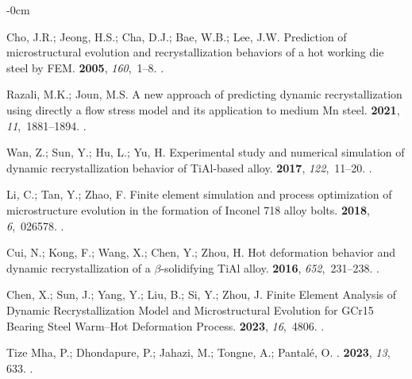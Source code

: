 \documentclass[metals,article,accept,pdftex,moreauthors]{Definitions/mdpi}
\begin{document}
\begin{adjustwidth}{-\extralength}{0cm}
\begin{thebibliography}{999}
Cho, J.R.; Jeong, H.S.; Cha, D.J.; Bae, W.B.; Lee, J.W.
\newblock Prediction of microstructural evolution and recrystallization
  behaviors of a hot working die steel by FEM.
 {\bf 2005}, {\em
  160},~1--8.
.

Razali, M.K.; Joun, M.S.
\newblock A new approach of predicting dynamic recrystallization using directly
  a flow stress model and its application to medium Mn steel.
 {\bf 2021}, {\em
  11},~1881--1894.
.

Wan, Z.; Sun, Y.; Hu, L.; Yu, H.
\newblock Experimental study and numerical simulation of dynamic
  recrystallization behavior of TiAl-based alloy.
 {\bf 2017}, {\em 122},~11--20.
.

Li, C.; Tan, Y.; Zhao, F.
\newblock Finite element simulation and process optimization of microstructure
  evolution in the formation of Inconel 718 alloy bolts.
 {\bf 2018}, {\em 6},~026578.
.

Cui, N.; Kong, F.; Wang, X.; Chen, Y.; Zhou, H.
\newblock Hot deformation behavior and dynamic recrystallization of a
  $\beta$-solidifying TiAl alloy.
 {\bf 2016}, {\em
  652},~231--238.
.

Chen, X.; Sun, J.; Yang, Y.; Liu, B.; Si, Y.; Zhou, J.
\newblock Finite Element Analysis of Dynamic Recrystallization Model and
  Microstructural Evolution for GCr15 Bearing Steel Warm--Hot Deformation
  Process.
 {\bf 2023}, {\em 16},~4806.
.

{Tize Mha}, P.; Dhondapure, P.; Jahazi, M.; Tongne, A.; Pantalé, O.
.
 {\bf 2023}, {\em 13}, 633.
.


\end{thebibliography}
\end{adjustwidth}
\end{document}
